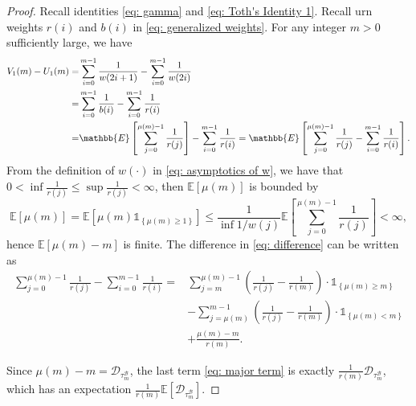 \documentclass[EJP]{ejpecp} %
\begin{document}
\begin{proof} 
	Recall identities \eqref{eq: gamma} and \eqref{eq: Toth's Identity 1}. 
	Recall urn weights $r(i)$ and $b(i)$ in \eqref{eq: generalized weights}.
	For any integer $m > 0$ sufficiently large, we have
	\begin{align}
		V_1(m) - U_1(m) =& \sum_{i=0}^{m-1} \frac{1}{w(2i+1)} -\sum_{i=0}^{m-1} \frac{1}{w(2i)} 
		\notag \\
		=& \sum_{i=0}^{m-1} \frac{1}{b(i)} -\sum_{i=0}^{m-1} \frac{1}{r(i)} 
		\notag \\
		=& 	\mathbb{E}\left[  \sum_{j=0}^{ \mu(m)-1 } \frac{1}{r(j)}   \right] - \sum_{i=0}^{m-1} \frac{1}{r(i)} = \mathbb{E}\left[  \sum_{j=0}^{ \mu(m)-1 } \frac{1}{r(j)}    - \sum_{i=0}^{m-1} \frac{1}{r(i)}\right]. \label{eq: difference}
	\end{align}
	From the definition of $w(\cdot)$ in \eqref{eq: asymptotics of w}, we have that $0< \inf \frac{1}{r(j)} \leq \sup \frac{1}{r(j)} <\infty $, then $\mathbb{E}\left[\mu(m)\right]$ is bounded by
	$$\mathbb{E}\left[ \mu(m) \right] = \mathbb{E}\left[ \mu(m)\mathbb{1}_{\left\{\mu(m)\geq 1 \right\} } \right] \leq  \frac{1}{\inf 1/w(j) }\mathbb{E}\left[  \sum_{j=0}^{ \mu(m)-1 } \frac{1}{r(j)}   \right] <\infty, $$ 
	hence $ \mathbb{E}\left[ \mu(m) -m\right]  $ is finite.
	The difference in \eqref{eq: difference} can be written as
	\begin{align} 
		\sum_{j=0}^{ \mu(m)-1 } \frac{1}{r(j)} - \sum_{i=0}^{m-1} \frac{1}{r(i)} =& \sum_{j=m}^{\mu(m)-1} \left(\frac{1}{r(j)} -\frac{1}{r(m)} \right) \cdot\mathbb{1}_{\left\{\mu(m)\geq m\right\}} 
		\label{eq: 1st term}
		\\	
		& - \sum_{j=\mu(m)}^{m-1} \left(\frac{1}{r(j)} -\frac{1}{r(m)} \right) \cdot \mathbb{1}_{\left\{\mu(m)< m\right\}} 
		\label{eq: 2nd term}
		\\
		& + \frac{\mu(m)-m}{ r(m) }. \label{eq: major term}
	\end{align} 

	Since $\mu(m)-m = \mathscr{D}_{\tau^{\mathscr{B}}_m}$, the last term \eqref{eq: major term} is exactly $\frac{1}{r(m)} \mathscr{D}_{\tau^{\mathscr{B}}_m}$, which has an expectation $\frac{1}{r(m)} \mathbb{E}\left[\mathscr{D}_{\tau^{\mathscr{B}}_m}\right]$. 
	

\end{proof}
\end{document}
